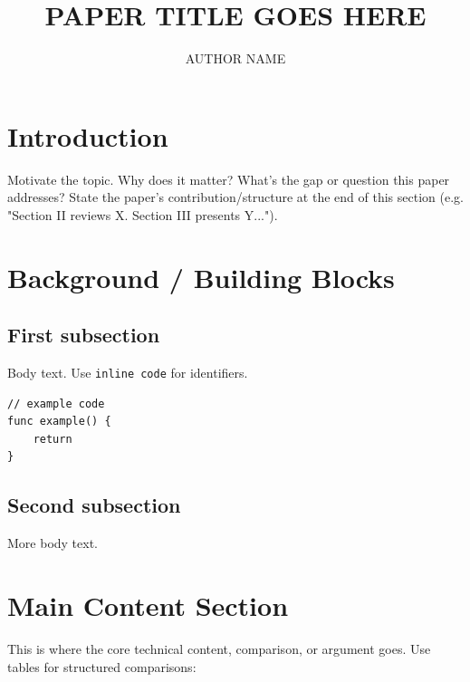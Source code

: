 \documentclass[10pt,twocolumn]{article}
\title{\bfseries PAPER TITLE GOES HERE}
\author{AUTHOR NAME}
\affil{AFFILIATION / DATE LINE}
\date{}
\begin{document}

\section{Introduction}
Motivate the topic. Why does it matter? What's the gap or question this
paper addresses? State the paper's contribution/structure at the end of
this section (e.g. "Section II reviews X. Section III presents Y...").

\section{Background / Building Blocks}

\subsection{First subsection}
Body text. Use \texttt{inline code} for identifiers.

\begin{lstlisting}[caption={Descriptive caption for this listing.}]
// example code
func example() {
    return
}
\end{lstlisting}

\subsection{Second subsection}
More body text.

\section{Main Content Section}
This is where the core technical content, comparison, or argument goes.
Use tables for structured comparisons:
\end{document}
